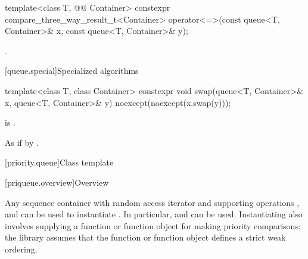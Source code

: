 %
\begin{itemdecl}
template<class T, @@ Container>
  constexpr compare_three_way_result_t<Container>
    operator<=>(const queue<T, Container>& x, const queue<T, Container>& y);
\end{itemdecl}

\begin{itemdescr}
\pnum
\returns
{}.
\end{itemdescr}

[queue.special]{Specialized algorithms}

%
\begin{itemdecl}
template<class T, class Container>
  constexpr void swap(queue<T, Container>& x, queue<T, Container>& y)
    noexcept(noexcept(x.swap(y)));
\end{itemdecl}

\begin{itemdescr}
\pnum
\constraints
{} is .

\pnum
\effects
As if by .
\end{itemdescr}

[priority.queue]{Class template }

[priqueue.overview]{Overview}

\pnum
{}%
Any sequence container with random access iterator and supporting operations
,
and
can be used to instantiate
.
In particular,
and
can be used.
Instantiating
also involves supplying a function or function object for making
priority comparisons; the library assumes that the function or function
object defines a strict weak ordering.

